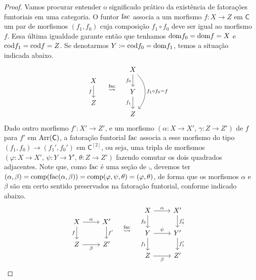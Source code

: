 \begin{proof}
  Vamos procurar entender o significado prático da existência de fatorações funtoriais em uma categoria.
  O funtor $\mathrm{fac}$ associa a um morfismo $f: X \to Z$ em $\mathsf{C}$ um par de morfismos $(f_{1},f_{0})$ cuja composição $f_{1} \circ f_{0}$ deve ser igual ao morfismo $f$.
  Essa última igualdade garante então que tenhamos $\mathrm{dom} f_{0} = \mathrm{dom} f = X$ e $\mathrm{cod} f_{1} = \mathrm{cod} f = Z$.
  Se denotarmos $Y \coloneqq \mathrm{cod} f_{0} = \mathrm{dom} f_{1}$, temos a situação indicada abaixo.
  \begin{displaymath}
    \begin{tikzcd}
      X
      \arrow[d, "f" swap]
      \\ Z
    \end{tikzcd}
    \quad \overset{\fac}{\rightsquigarrow} \quad
    \begin{tikzcd}
      X
      \arrow[d, "f_{0}" swap]
      \arrow[dd, bend left=45, "f_{1} \circ f_{0} = f"]
      \\ Y
      \arrow[d, "f_{1}" swap]
      \\ Z
    \end{tikzcd}
  \end{displaymath}
  Dado outro morfismo $f': X' \to Z'$, e um morfismo $(\alpha: X \to X',\, \gamma: Z \to Z')$ de $f$ para $f'$ em $\mathrm{Arr}(\mathsf{C})$, a fatoração funtorial $\mathrm{fac}$ associa a esse morfismo do tipo $(f_{1},f_{0}) \to (f_{1}',f_{0}')$ em $\mathsf{C}^{[2]}$, ou seja, uma tripla de morfismos $(\varphi: X \to X',\, \psi: Y \to Y',\, \theta: Z \to Z')$ fazendo comutar os dois quadrados adjacentes.
  Note que, como $\mathrm{fac}$ é uma seção de $\comp$, devemos ter $(\alpha,\beta) = \mathrm{comp}(\mathrm{fac}(\alpha,\beta)) = \mathrm{comp}(\varphi,\psi,\theta) = (\varphi,\theta)$, de forma que os morfismos $\alpha$ e $\beta$ são em certo sentido preservados na fatoração funtorial, conforme indicado abaixo.
  \begin{displaymath}
    \begin{tikzcd}
      X
      \arrow[d, "f" swap]
      \arrow[r, "\alpha"]
      & X'
      \arrow[d, "f'"]
      \\ Z
      \arrow[r, "\beta" swap]
      & Z'
    \end{tikzcd}
    \quad \overset{\fac}{\rightsquigarrow} \quad
    \begin{tikzcd}
      X
      \arrow[r, "\alpha"]
      \arrow[d, "f_{0}" swap]
      & X'
      \arrow[d, "f_{0}'"]
      \\ Y
      \arrow[d, "f_{1}" swap]
      \arrow[r, "\psi"]
      & Y'
      \arrow[d, "f_{1}'"]
      \\ Z
      \arrow[r, "\beta" swap]
      & Z'
    \end{tikzcd}
  \end{displaymath}
  

\end{proof}
